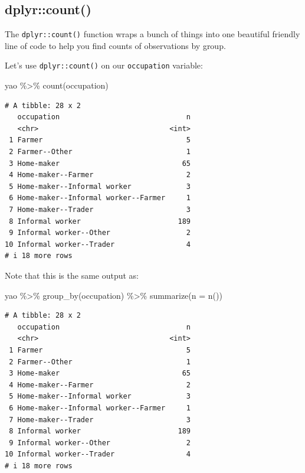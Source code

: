 \documentclass[
  letterpaper,
  DIV=11,
  numbers=noendperiod]{scrreprt}
\newenvironment{Shaded}{\begin{snugshade}}{\end{snugshade}}
\newcommand{\AttributeTok}[1]{\textcolor[rgb]{0.40,0.45,0.13}{#1}}
\newcommand{\FunctionTok}[1]{\textcolor[rgb]{0.28,0.35,0.67}{#1}}
\newcommand{\NormalTok}[1]{\textcolor[rgb]{0.00,0.23,0.31}{#1}}
\newcommand{\SpecialCharTok}[1]{\textcolor[rgb]{0.37,0.37,0.37}{#1}}
\begin{document}
\hypertarget{dplyrcount}{%
\subsection{dplyr::count()}\label{dplyrcount}}

The \texttt{dplyr::count()} function wraps a bunch of things into one
beautiful friendly line of code to help you find counts of observations
by group.

Let's use \texttt{dplyr::count()} on our \texttt{occupation} variable:

\begin{Shaded}
\begin{Highlighting}[]
\NormalTok{yao }\SpecialCharTok{\%\textgreater{}\%}
  \FunctionTok{count}\NormalTok{(occupation)}
\end{Highlighting}
\end{Shaded}

\begin{verbatim}
# A tibble: 28 x 2
   occupation                              n
   <chr>                               <int>
 1 Farmer                                  5
 2 Farmer--Other                           1
 3 Home-maker                             65
 4 Home-maker--Farmer                      2
 5 Home-maker--Informal worker             3
 6 Home-maker--Informal worker--Farmer     1
 7 Home-maker--Trader                      3
 8 Informal worker                       189
 9 Informal worker--Other                  2
10 Informal worker--Trader                 4
# i 18 more rows
\end{verbatim}

Note that this is the same output as:

\begin{Shaded}
\begin{Highlighting}[]
\NormalTok{yao }\SpecialCharTok{\%\textgreater{}\%}
  \FunctionTok{group\_by}\NormalTok{(occupation) }\SpecialCharTok{\%\textgreater{}\%} 
  \FunctionTok{summarize}\NormalTok{(}\AttributeTok{n =} \FunctionTok{n}\NormalTok{())}
\end{Highlighting}
\end{Shaded}

\begin{verbatim}
# A tibble: 28 x 2
   occupation                              n
   <chr>                               <int>
 1 Farmer                                  5
 2 Farmer--Other                           1
 3 Home-maker                             65
 4 Home-maker--Farmer                      2
 5 Home-maker--Informal worker             3
 6 Home-maker--Informal worker--Farmer     1
 7 Home-maker--Trader                      3
 8 Informal worker                       189
 9 Informal worker--Other                  2
10 Informal worker--Trader                 4
# i 18 more rows
\end{verbatim}
\end{document}

